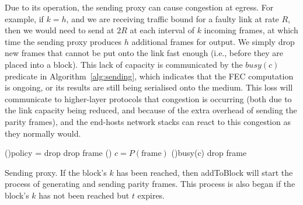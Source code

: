 Due to its operation, the sending proxy can cause congestion at egress.
For example, if $k = h$, and we are receiving traffic bound for
a faulty link at rate $R$, then we would need to send at $2R$ at each interval
of $k$ incoming frames, at which time the sending proxy produces $h$ additional
frames for output. We simply drop new frames that cannot be put onto the link
fast enough (i.e., before they are placed into a block). This lack of capacity
is communicated by the $\mathit{busy}(c)$ predicate in
Algorithm~\ref{alg:sending}, which indicates that the FEC computation is
ongoing, or its results are still being serialised onto the medium. This loss
will communicate to higher-layer protocols that congestion is occurring (both
due to the link capacity being reduced, and because of the extra overhead of
sending the parity frames), and the end-hosts network stacks can react to this
congestion as they normally would.

\begin{algorithm}
\SetAlgoLined
{}
\uIf(){policy = drop}{
drop frame\;
}\Else(){
  $c = P(\mathrm{frame})$ 
  \uIf(){busy(c)}{
drop frame\;
}
}
\caption{\label{alg:sending}Sending proxy. If the block's $k$ has been reached, then addToBlock will start the process of generating and sending parity frames. This process is also began if the block's $k$ has not been reached but $t$ expires.}
\end{algorithm}


